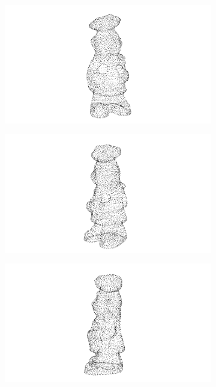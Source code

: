 \begin{figure}
	\centering
	\begin{subfigure}[b]{0.24\textwidth}
		\includegraphics[width=\textwidth]{img/ejemplos_nubes/chef_01.png}
	\end{subfigure}
	\begin{subfigure}[b]{0.24\textwidth}
		\includegraphics[width=\textwidth]{img/ejemplos_nubes/chef_02.png}
	\end{subfigure}
	\begin{subfigure}[b]{0.24\textwidth}
		\includegraphics[width=\textwidth]{img/ejemplos_nubes/chef_03.png}

\end{subfigure}
\end{figure}
